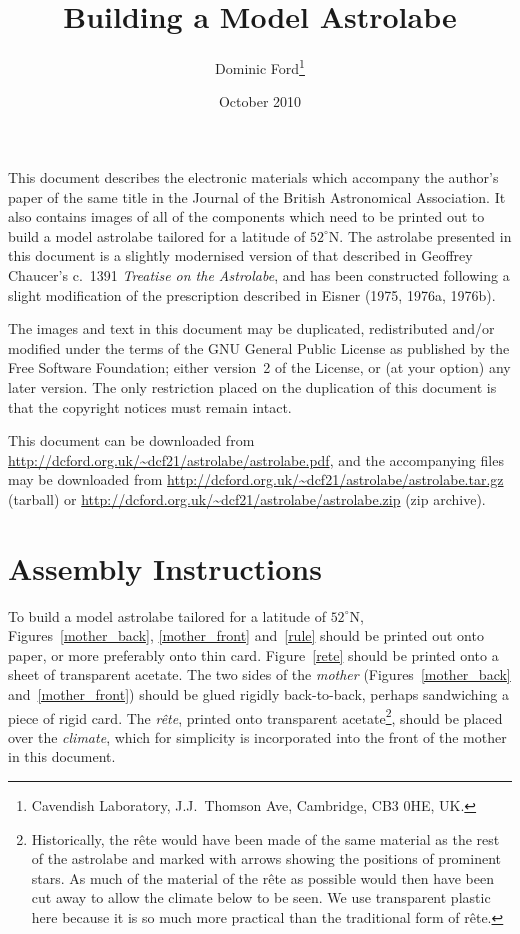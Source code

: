 \documentclass[a4paper,onecolumn,10pt]{article}
\title{Building a Model Astrolabe}
\author{Dominic Ford\footnote{Cavendish Laboratory, J.J.\ Thomson Ave, Cambridge, CB3 0HE, UK.}}
\date{October 2010}
\begin{document}
\maketitle
\setcounter{footnote}{1}

This document describes the electronic materials which accompany the author's
paper of the same title in the Journal of the British Astronomical Association.
It also contains images of all of the components which need to be printed out
to build a model astrolabe tailored for a latitude of $52^\circ$N. The
astrolabe presented in this document is a slightly modernised version of that
described in Geoffrey Chaucer's c.\ 1391 {\it Treatise on the Astrolabe}, and
has been constructed following a slight modification of the prescription
described in Eisner (1975, 1976a, 1976b).

The images and text in this document may be duplicated, redistributed and/or
modified under the terms of the GNU General Public License as published by the
Free Software Foundation; either version~2 of the License, or (at your option)
any later version. The only restriction placed on the duplication of this
document is that the copyright notices must remain intact.

This document can be downloaded from
\url{http://dcford.org.uk/~dcf21/astrolabe/astrolabe.pdf}, and the accompanying
files may be downloaded from
\url{http://dcford.org.uk/~dcf21/astrolabe/astrolabe.tar.gz} (tarball) or
\url{http://dcford.org.uk/~dcf21/astrolabe/astrolabe.zip} (zip archive).

\section*{Assembly Instructions}

To build a model astrolabe tailored for a latitude of $52^\circ$N,
Figures~\ref{mother_back}, \ref{mother_front} and~\ref{rule} should be printed
out onto paper, or more preferably onto thin card.  Figure~\ref{rete} should be
printed onto a sheet of transparent acetate.  The two sides of the {\it mother}
(Figures~\ref{mother_back} and~\ref{mother_front}) should be glued rigidly
back-to-back, perhaps sandwiching a piece of rigid card. The {\it r\^ete},
printed onto transparent acetate\footnote{Historically, the r\^ete would have
been made of the same material as the rest of the astrolabe and marked with
arrows showing the positions of prominent stars. As much of the material of the
r\^ete as possible would then have been cut away to allow the climate below to
be seen. We use transparent plastic here because it is so much more practical
than the traditional form of r\^ete.}, should be placed over the {\it climate},
which for simplicity is incorporated into the front of the mother in this
document.
\end{document}
